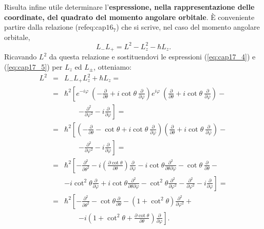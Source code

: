 \documentclass[a4paper,12pt,oneside]{book}
\begin{document}
Risulta infine utile determinare l'\textbf{espressione, nella rappresentazione delle coordinate, del quadrato del momento angolare orbitale}. È conveniente partire dalla relazione (refeq:cap$16_7$) che si scrive, nel caso del momento angolare orbitale,
\begin{equation}
L_- L_+ = L^2 -L_z ^2 -\hbar L_z .
\end{equation}
Ricavando $L^2$ da questa relazione e sostituendovi le espressioni (\ref{eq:cap17_4}) e (\ref{eq:cap17_5}) per $L_z$ ed $L_{\pm}$, otteniamo:
\begin{eqnarray}
L^2 &=& L_-L_+ L_z^2 +\hbar L_z = \nonumber \\
&=& \hbar ^2 \left[e^{-i\varphi}\ \left(-\frac{\partial}{\partial \theta}+i \cot \theta\ \frac{\partial}{\partial \varphi}\right)e^{i\varphi}\ \left(\frac{\partial}{\partial \theta}+i \cot \theta\ \frac{\partial}{\partial \varphi}\right)-\right. \nonumber \\
& &\qquad \left. -\frac{\partial ^2}{\partial \varphi ^2}- i\frac{\partial}{\partial \varphi}\right] = \nonumber \\
&=&\hbar ^ 2 \left[ \left( -\frac{\partial}{\partial \theta}-\cot\theta +i \cot\theta\ \frac{\partial}{\partial \varphi}\right)\left(\frac{\partial}{\partial \theta}+i \cot \theta \ \frac{\partial}{\partial \varphi}\right)-\right. \nonumber \\
& &\qquad \left. -\frac{\partial ^2}{\partial \varphi ^2}- i\frac{\partial}{\partial \varphi}\right] = \nonumber \\
&=& \hbar ^2 \left[ -\frac{\partial ^2}{\partial \theta ^2}-i\left( \frac{\partial \cot \theta}{\partial \theta}\right) \frac{\partial }{\partial \varphi }-i\cot \theta \frac{\partial ^2}{\partial \theta \partial \varphi}-\cot \theta\ \frac{\partial }{\partial \theta}-\right. \nonumber \\
& & \left. -i \cot ^2 \theta \frac{\partial }{\partial \varphi}+i \cot\theta \frac{\partial ^2}{\partial \theta \partial \varphi}-\cot ^2 \theta \frac{\partial ^2}{\partial \varphi ^2}-\frac{\partial ^2}{\partial \varphi ^2}-i\frac{\partial }{\partial \varphi}\right] = \nonumber \\
&=& \hbar^2 \left[ -\frac{\partial ^2}{\partial \theta ^2}-\cot \theta \frac{\partial }{\partial \theta}-\left(1+ \cot ^2 \theta\right) \frac{\partial ^2}{\partial \varphi ^2}+\right. \nonumber \\
& &\qquad \left. -i\left( 1+\cot ^2 \theta +\frac{\partial \cot \theta}{\partial \theta}\right)\frac{\partial}{\partial \varphi}\right] .
\end{eqnarray}
\end{document}
